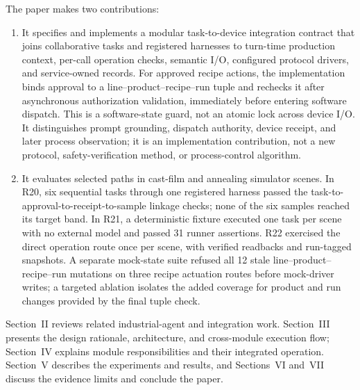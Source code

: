 The paper makes two contributions:
\begin{enumerate}
\item It specifies and implements a modular task-to-device integration
  contract that
  joins collaborative tasks and registered harnesses to turn-time production
  context, per-call operation checks, semantic I/O, configured protocol
  drivers, and service-owned records. For approved recipe actions, the
  implementation binds approval to a line--product--recipe--run tuple and
  rechecks it after asynchronous authorization validation, immediately before
  entering software dispatch. This is a software-state guard, not an atomic
  lock across device I/O. It
  distinguishes prompt grounding, dispatch authority, device receipt, and
  later process observation; it is an implementation contribution, not a new
  protocol, safety-verification method, or process-control algorithm.
\item It evaluates selected paths in cast-film and annealing simulator scenes.
  In R20, six sequential tasks through one registered harness passed the
  task-to-approval-to-receipt-to-sample linkage checks; none of the six samples
  reached its target band. In R21, a deterministic fixture executed one task
  per scene with no external model and passed 31 runner assertions. R22
  exercised the direct operation route once per scene, with verified
  readbacks and run-tagged snapshots. A separate mock-state suite refused all 12 stale
  line--product--recipe--run mutations on three recipe actuation routes before
  mock-driver writes; a targeted ablation isolates the added coverage for
  product and run changes provided by the final tuple check.
\end{enumerate}

Section~II reviews related industrial-agent and integration work.
Section~III presents the design rationale, architecture, and cross-module
execution flow; Section~IV explains module responsibilities and their
integrated operation. Section~V describes the experiments and results, and
Sections~VI and~VII discuss the evidence limits and conclude the paper.
